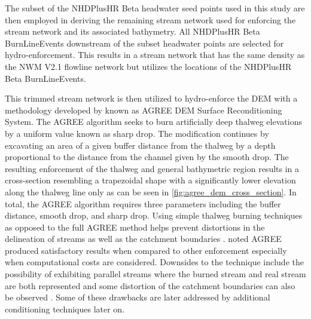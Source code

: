 The subset of the NHDPlusHR Beta headwater seed points used in this study are then employed in deriving the remaining stream network used for enforcing the stream network and its associated bathymetry. 
All NHDPlusHR Beta BurnLineEvents downstream of the subset headwater points are selected for hydro-enforcement. 
This results in a stream network that has the same density as the NWM V2.1 flowline network but utilizes the locations of the NHDPlusHR Beta BurnLineEvents. 

This trimmed stream network is then utilized to hydro-enforce the DEM with a methodology developed by  known as AGREE DEM Surface Reconditioning System. 
The AGREE algorithm seeks to burn artificially deep thalweg elevations by a uniform value known as sharp drop. 
The modification continues by excavating an area of a given buffer distance from the thalweg by a depth proportional to the distance from the channel given by the smooth drop. 
The resulting enforcement of the thalweg and general bathymetric region results in a cross-section resembling a trapezoidal shape with a significantly lower elevation along the thalweg line only as can be seen in \ref{fig:agree_dem_cross_section}.
In total, the AGREE algorithm requires three parameters including the buffer distance, smooth drop, and sharp drop. 
Using simple thalweg burning techniques as opposed to the full AGREE method helps prevent distortions in the delineation of streams as well as the catchment boundaries \cite{saunders1995grid,saunders1996gis,mizgalewicz1996modeling,hellweger1997agree,quenzer1998gis,baker2006comparison,}.
 noted AGREE produced satisfactory results when compared to other enforcement especially when computational costs are considered. 
Downsides to the technique include the possibility of exhibiting parallel streams where the burned stream and real stream are both represented \cite{hellweger1997agree,saunders1999preparation} and some distortion of the catchment boundaries can also be observed \cite{saunders1999preparation,saunders1996gis}. Some of these drawbacks are later addressed by additional conditioning techniques later on.


